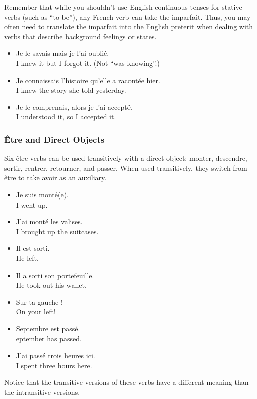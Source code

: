 Remember that while you shouldn't use English continuous tenses for stative verbs (such as ``to be''), any French verb can take the imparfait. Thus, you may often need to translate the imparfait into the English preterit when dealing with verbs that describe background feelings or states.

\begin{itemize}
  \item  Je le savais mais je l'ai oubli{\'e}. \\ I knew it but I forgot it. (Not ``was knowing''.)
	\item  Je connaissais l'histoire qu'elle a racont{\'e}e hier. \\ I knew the story she told yesterday.
	\item  Je le comprenais, alors je l'ai accept{\'e}. \\ I understood it, so I accepted it.
\end{itemize}

\subsubsection{{\^E}tre and Direct Objects}

Six {\^e}tre verbs can be used transitively with a direct object: monter, descendre, sortir, rentrer, retourner, and passer. When used transitively, they switch from {\^e}tre to take avoir as an auxiliary.

\begin{itemize}
  \item  Je suis mont{\'e}(e). \\ I went up.
	\item  J'ai monté les valises. \\ I brought up the suitcases.
	\item  Il est sorti. \\ He left.
	\item  Il a sorti son portefeuille. \\ He took out his wallet.
	\item  Sur ta gauche ! \\ On your left!
	\item  Septembre est pass{\'e}. \\ eptember has passed.
	\item  J'ai passé trois heures ici. \\ I spent three hours here.
\end{itemize}

Notice that the transitive versions of these verbs have a different meaning than the intransitive versions.

